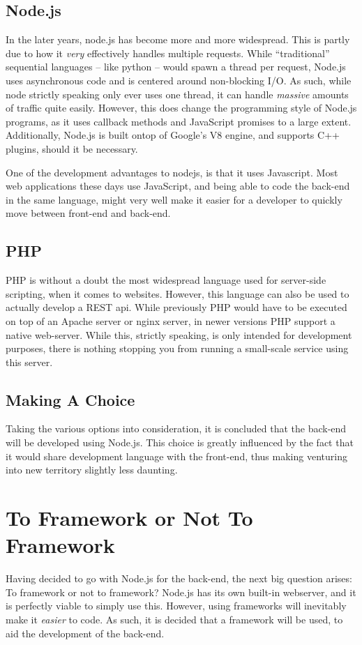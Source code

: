 		\subsection{Node.js}
			In the later years, node.js has become more and more widespread. This is partly due to how it \emph{very} effectively handles multiple requests. While ``traditional'' sequential languages -- like python -- would spawn a thread per request, Node.js uses asynchronous code and is centered around non-blocking I/O. As such, while node strictly speaking only ever uses one thread, it can handle \emph{massive} amounts of traffic quite easily. However, this does change the programming style of Node.js programs, as it uses callback methods and JavaScript promises to a large extent. Additionally, Node.js is built ontop of Google's V8 engine, and supports C++ plugins, should it be necessary.

			One of the development advantages to nodejs, is that it uses Javascript. Most web applications these days use JavaScript, and being able to code the back-end in the same language, might very well make it easier for a developer to quickly move between front-end and back-end.

		\subsection{PHP}
			PHP is without a doubt the most widespread language used for server-side scripting, when it comes to websites. However, this language can also be used to actually develop a REST api. While previously PHP would have to be executed on top of an Apache server or nginx server, in newer versions PHP support a native web-server. While this, strictly speaking, is only intended for development purposes, there is nothing stopping you from running a small-scale service using this server.

		\subsection{Making A Choice}
			Taking the various options into consideration, it is concluded that the back-end will be developed using Node.js. This choice is greatly influenced by the fact that it would share development language with the front-end, thus making venturing into new territory slightly less daunting.


	\section{To Framework or Not To Framework}
		Having decided to go with Node.js for the back-end, the next big question arises: To framework or not to framework? Node.js has its own built-in webserver, and it is perfectly viable to simply use this. However, using frameworks will inevitably make it \emph{easier} to code. As such, it is decided that a framework will be used, to aid the development of the back-end.

